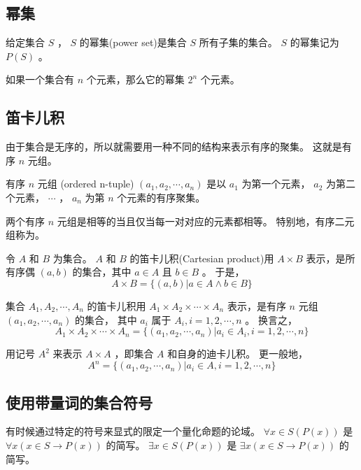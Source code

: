 {    \subsection{幂集}
    {
        \begin{defines}
            给定集合 $S$ ， $S$ 的幂集(power set)是集合 $S$ 所有子集的集合。
            $S$ 的幂集记为 $P (S)$ 。
        \end{defines}

        如果一个集合有 $n$ 个元素，那么它的幂集 $2^n$ 个元素。
    }

    \subsection{笛卡儿积}
    {
        由于集合是无序的，所以就需要用一种不同的结构来表示有序的聚集。
        这就是有序 $n$ 元组。

        \begin{defines}
            有序 $n$ 元组 (ordered n-tuple) $(a_1, a_2, \cdots , a_n)$ 是以 $a_1$ 为第一个元素， $a_2$ 为第二个元素， $\cdots$ ， $a_n$ 为第 $n$ 个元素的有序聚集。
        \end{defines}

        两个有序 $n$ 元组是相等的当且仅当每一对对应的元素都相等。
        特别地，有序二元组称为。

        \begin{defines}
            令 $A$ 和 $B$ 为集合。
            $A$ 和 $B$ 的笛卡儿积(Cartesian product)用 $A \times B$ 表示，是所有序偶 $(a, b)$ 的集合，其中 $a \in A$ 且 $b \in B$ 。
            于是，
            $$A \times B = \{(a, b) | a \in A \wedge b \in B\}$$
        \end{defines}

        \begin{defines}
            集合 $A_1, A_2, \cdots , A_n$ 的笛卡儿积用 $A_1 \times A_2 \times \cdots \times A_n$ 表示，是有序 $n$ 元组 $(a_1, a_2, \cdots , a_n)$ 的集合，
            其中 $a_i$ 属于 $A_i, i = 1, 2, \cdots , n$ 。
            换言之，
            $$A_1 \times A_2 \times \cdots \times A_n = \{(a_1, a_2, \cdots , a_n) | a_i \in A_i, i = 1, 2, \cdots , n\}$$
        \end{defines}

        用记号 $A^2$ 来表示 $A \times A$ ，即集合 $A$ 和自身的迪卡儿积。
        更一般地，
        $$A^n = \{(a_1, a_2, \cdots , a_n) | a_i \in A, i = 1, 2, \cdots , n\}$$
    }

    \subsection{使用带量词的集合符号}
    {
        有时候通过特定的符号来显式的限定一个量化命题的论域。
        $\forall x \in S (P(x))$ 是 $\forall x (x \in S \rightarrow P(x))$ 的简写。
        $\exists x \in S (P(x))$ 是 $\exists x (x \in S \rightarrow P(x))$ 的简写。
    }

}
